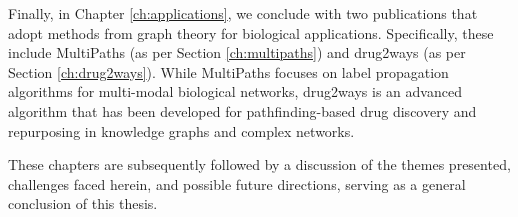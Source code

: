 Finally, in Chapter \ref{ch:applications}, we conclude with two publications that adopt methods from graph theory for biological applications. Specifically, these include MultiPaths (as per Section \ref{ch:multipaths}) and drug2ways (as per Section \ref{ch:drug2ways}). While MultiPaths focuses on label propagation algorithms for multi-modal biological networks, drug2ways is an advanced algorithm that has been developed for pathfinding-based drug discovery and repurposing in knowledge graphs and complex networks.

These chapters are subsequently followed by a discussion of the themes presented, challenges faced herein, and possible future directions, serving as a general conclusion of this thesis. 






